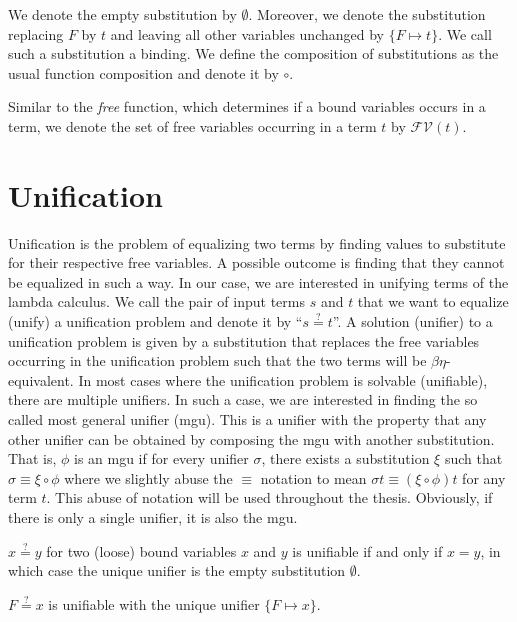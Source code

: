 We denote the empty substitution by $\emptyset$. Moreover, we denote the substitution replacing $F$ by $t$ and leaving all other variables unchanged by $\{F \mapsto t\}$. We call such a substitution a binding. We define the composition of substitutions as the usual function composition and denote it by $\circ$.

Similar to the \textit{free} function, which determines if a bound variables occurs in a term, we denote the set of free variables occurring in a term $t$ by $\mathcal{FV} (t)$.

\section{Unification}
\label{sec:unification}

Unification is the problem of equalizing two terms by finding values to substitute for their respective free variables. A possible outcome is finding that they cannot be equalized in such a way. In our case, we are interested in unifying terms of the lambda calculus. We call the pair of input terms $s$ and $t$ that we want to equalize (unify) a unification problem and denote it by ``$s \overset{?}{=} t$''. A solution (unifier) to a unification problem is given by a substitution that replaces the free variables occurring in the unification problem such that the two terms will be $\beta\eta$-equivalent. In most cases where the unification problem is solvable (unifiable), there are multiple unifiers. In such a case, we are interested in finding the so called most general unifier (mgu). This is a unifier with the property that any other unifier can be obtained by composing the mgu with another substitution. That is, $\phi$ is an mgu if for every unifier $\sigma$, there exists a substitution $\xi$ such that $\sigma \equiv \xi \circ \phi$ where we slightly abuse the $\equiv$ notation to mean $\sigma t \equiv \left( \xi \circ \phi \right) t$  for any term $t$. This abuse of notation will be used throughout the thesis. Obviously, if there is only a single unifier, it is also the mgu.

\begin{example}
	$x \overset{?}{=} y$ for two (loose) bound variables $x$ and $y$ is unifiable if and only if $x = y$, in which case the unique unifier is the empty substitution $\emptyset$.
\end{example}

\begin{example}
	$F \overset{?}{=} x$ is unifiable with the unique unifier $\{F \mapsto x\}$.
\end{example}

